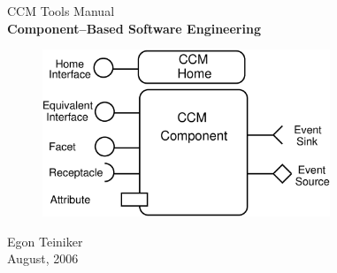 \begin{titlepage}
\begin{center}

  	\vspace*{3cm}
  	{\LARGE CCM Tools Manual} \\
  	\vspace{2cm}
  	{\huge \bf Component--Based Software Engineering} \\
  	\vspace{15mm}

	\begin{figure}[htbp]
		\begin{center}
			\includegraphics[height=5cm,angle=0] {figures/CCMSymbol}
	  	\end{center}
	\end{figure}
  	
  	\vspace{1cm}
  	{\LARGE Egon Teiniker} \\
  	
  	\vspace{15mm}
  	{\large August, 2006} 

\end{center}
\end{titlepage}